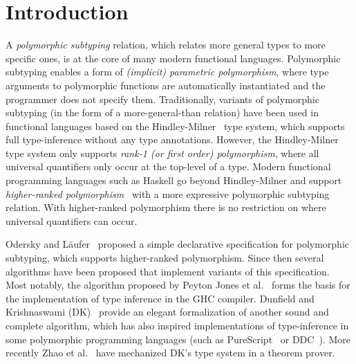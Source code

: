 \section{Introduction}

A \emph{polymorphic subtyping} relation, which relates more general
types to more specific ones, is at the core of many modern functional
languages. Polymorphic subtyping enables a form of
\emph{(implicit) parametric polymorphism}, where type arguments to polymorphic
functions are automatically instantiated and the programmer does not specify them.
Traditionally, variants of polymorphic subtyping (in the form of a more-general-than relation)
have been used in functional languages based on the
Hindley-Milner~\cite{hindley1969principal,milner1978theory,damas1982principal}
type system, which supports full type-inference without any type annotations.
However, the Hindley-Milner type system only supports \emph{rank-1 (or first order)
polymorphism}, where all universal quantifiers only occur at the top-level
of a type.  Modern functional programming languages such as Haskell go beyond
Hindley-Milner and support \emph{higher-ranked polymorphism}~\cite{odersky1996putting,jones2007practical}
with a more expressive
polymorphic subtyping relation. With higher-ranked
polymorphism there is no restriction on where universal quantifiers can occur.

Odersky and L\"aufer~\cite{odersky1996putting} proposed a
simple declarative specification for polymorphic subtyping, which supports higher-ranked polymorphism.
Since then several
algorithms have been proposed that implement variants of this specification. Most
notably, the algorithm proposed by Peyton Jones et al.~\cite{jones2007practical} forms the basis
for the implementation of type inference in the GHC compiler.
Dunfield and Krishnaswami (DK)~\cite{dunfield2013complete} provide an elegant
formalization of another sound and complete algorithm, which has
also inspired implementations of type-inference in some polymorphic
programming languages (such as PureScript~\cite{PureScript} or DDC~\cite{Disciple}).
More recently Zhao et al.~\cite{zhao19mechanical} have mechanized DK's type system in a theorem prover.


